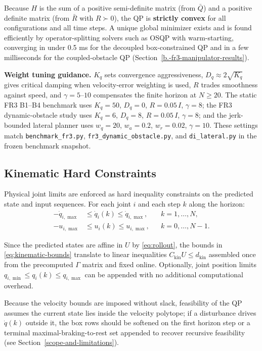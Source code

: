 Because \(H\) is the sum of a positive semi-definite matrix (from
\(\bar{Q}\)) and a positive definite matrix (from \(\bar{R}\) with
\(R \succ 0\)), the QP is \textbf{strictly convex} for all
configurations and all time steps. A unique global minimizer exists and
is found efficiently by operator-splitting solvers such as OSQP \cite{osqp}
with warm-starting, converging in under 0.5 ms for the decoupled
box-constrained QP and in a few milliseconds for the coupled-obstacle QP
(Section~\ref{b.-fr3-manipulator-results}).

\textbf{Weight tuning guidance.} \(K_q\) sets convergence aggressiveness,
\(D_q\!\approx\!2\sqrt{K_q}\) gives critical damping when velocity-error
weighting is used, \(R\) trades smoothness against speed, and
\(\gamma=5\)--\(10\) compensates the finite horizon at \(N\geq20\). The
static FR3 B1--B4 benchmark uses \(K_q=50\), \(D_q=0\),
\(R=0.05\,I\), \(\gamma=8\); the FR3 dynamic-obstacle study uses
\(K_q=6\), \(D_q=8\), \(R=0.05\,I\), \(\gamma=8\); and the jerk-bounded
lateral planner uses \(w_q=20\), \(w_a=0.2\), \(w_r=0.02\),
\(\gamma=10\). These settings match \texttt{benchmark\_fr3.py},
\texttt{fr3\_dynamic\_obstacle.py}, and \texttt{di\_lateral.py} in the
frozen benchmark snapshot.

\subsection{Kinematic Hard
Constraints}\label{c.-kinematic-hard-constraints}

Physical joint limits are enforced as hard inequality constraints on the
predicted state and input sequences. For each joint \(i\) and each step
\(k\) along the horizon:
\begin{align}
\label{eq:kinematic-bounds}
-\dot{q}_{i,\max} &\leq \dot{q}_{i}(k) \leq \dot{q}_{i,\max},
&& k=1,\dots,N, \nonumber\\
-u_{i,\max} &\leq u_i(k) \leq u_{i,\max},
&& k=0,\dots,N-1 .
\end{align}

Since the predicted states are affine in \(U\) by \eqref{eq:rollout},
the bounds in \eqref{eq:kinematic-bounds} translate to linear inequalities
\(C_{\text{kin}} U \leq d_{\text{kin}}\) assembled once from the
precomputed \(\Gamma\) matrix and fixed online. Optionally, joint
position limits \(q_{i,\min} \leq q_i(k) \leq q_{i,\max}\) can be
appended with no additional computational overhead.

Because the velocity bounds are imposed without slack, feasibility of the
QP assumes the current state lies inside the velocity polytope; if a
disturbance drives \(\dot q(k)\) outside it, the box rows should be
softened on the first horizon step or a terminal maximal-braking-to-rest
set appended to recover recursive feasibility (see
Section~\ref{scope-and-limitations}).

